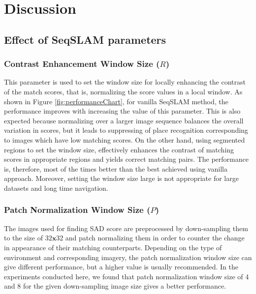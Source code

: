 \documentclass[twocolumn]{article}
\begin{document}
\section{Discussion}
\subsection{Effect of SeqSLAM parameters}
\subsubsection{Contrast Enhancement Window Size ($R$)}
This parameter is used to set the window size for locally enhancing the contrast of the match scores, that is, normalizing the score values in a local window. As shown in Figure \ref{fig:performanceChart}, for vanilla SeqSLAM method, the performance improves with increasing the value of this parameter. This is also expected because normalizing over a larger image sequence balances the overall variation in scores, but it leads to suppressing of place recognition corresponding to images which have low matching scores. On the other hand, using segmented regions to set the window size, effectively enhances the contrast of matching scores in appropriate regions and yields correct matching pairs. The performance is, therefore, most of the times better than the best achieved using vanilla approach. Moreover, setting the window size large is not appropriate for large datasets and long time navigation.

\subsubsection{Patch Normalization Window Size ($P$)}
The images used for finding SAD score are preprocessed by down-sampling them to the size of $32\mathbf{x}32$ and patch normalizing them in order to counter the change in appearance of their matching counterparts. Depending on the type of environment and corresponding imagery, the patch normalization window size can give different performance, but a higher value is usually recommended. In the experiments conducted here, we found that patch normalization window size of 4 and 8 for the given down-sampling image size gives a better performance.
\end{document}
